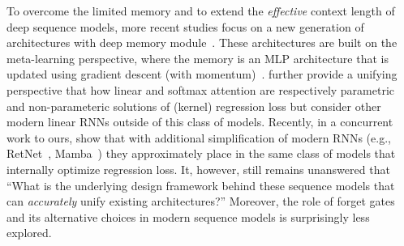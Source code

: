 \documentclass{article}
\newcommand{\citep}{\parencite}
\newcommand{\citet}{\textcite}
\theoremstyle{plain}
\theoremstyle{definition}
\theoremstyle{remark}
\newcommand{\head}[1]{\vspace{1.7mm}\noindent{{\textcolor{c2}{\bf #1.}}}}
\begin{document}
\head{Deep Memory Module: Titans and Test Time Training}
To overcome the limited memory and to extend the \emph{effective} context length of deep sequence models, more recent studies focus on a new generation of architectures with deep memory module~\citep{behrouz2024titans, sun2024learning}. These architectures are built on the meta-learning perspective, where the memory is an MLP architecture that is updated using gradient descent (with momentum)~\citep{behrouz2024titans, sun2024learning}. \citet{sun2024learning} further provide a unifying perspective that how linear and softmax attention are respectively parametric and non-parameteric solutions of (kernel) regression loss but consider other modern linear RNNs outside of this class of models. Recently, in a concurrent work to ours, \citet{wang2025test} show that with additional simplification of modern RNNs (e.g., RetNet~\citep{sun2023retentive}, Mamba~\citep{dao2024transformers}) they approximately place in the same class of models that internally optimize regression loss. It, however, still remains unanswered that ``What is the underlying design framework behind these sequence models that can \emph{accurately} unify existing architectures?'' Moreover, the role of forget gates and its alternative choices in modern sequence models is surprisingly less explored.  



\end{document}
